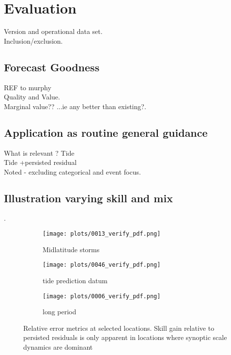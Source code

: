\section{Evaluation}


Version and operational data set.\\
Inclusion/exclusion.


\subsection{Forecast Goodness}

REF to murphy\\
Quality and Value.\\
Marginal value?? ...ie any better than existing?.\\



\subsection{Application as routine general guidance}

What is relevant ?
Tide\\
Tide +persisted residual\\

Noted - excluding categorical and event focus.



\subsection{Illustration varying skill and mix}.



\begin{figure}[H]
\centering
    \begin{subfigure}[b]{0.3\textwidth}
        \texttt{[image: plots/0013\_verify\_pdf.png]}
        \caption{Midlatitude storms}
    \end{subfigure}
    \begin{subfigure}[b]{0.3\textwidth}
        \texttt{[image: plots/0046\_verify\_pdf.png]}
        \caption{tide prediction datum}
    \end{subfigure}
        \begin{subfigure}[b]{0.3\textwidth}
        \texttt{[image: plots/0006\_verify\_pdf.png]}
        \caption{long period}
    \end{subfigure}
\caption{ Relative error metrics at selected locations. Skill gain relative to persisted residuals is only apparent in locations where synoptic scale dynamics are dominant}
\label{fig:pdf_c}
\end{figure}   


